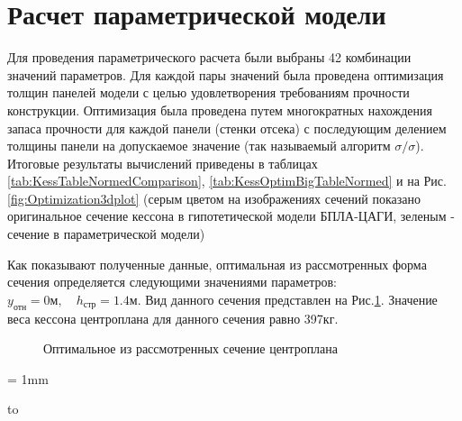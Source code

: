 \section{Расчет параметрической модели}
\label{sec:calculationOfModel}
Для проведения параметрического расчета были выбраны 42 комбинации значений параметров. Для каждой пары значений была проведена оптимизация толщин панелей модели с целью удовлетворения требованиям прочности конструкции. Оптимизация была проведена путем многократных нахождения запаса прочности для каждой панели (стенки отсека) с последующим делением толщины панели на допускаемое значение (так называемый алгоритм $\sigma/\sigma$). Итоговые результаты вычислений приведены в таблицах \ref{tab:KessTableNormedComparison}, \ref{tab:KessOptimBigTableNormed} и на Рис.\ref{fig:Optimization3dplot} (серым цветом на изображениях сечений показано оригинальное сечение кессона в гипотетической модели БПЛА-ЦАГИ, зеленым - сечение в параметрической модели)  


Как показывают полученные данные, оптимальная из рассмотренных форма сечения определяется следующими значениями параметров: $y_\text{отн} = 0\text{м},\quad h_\text{стр}=1.4\text{м}$. Вид данного сечения представлен на Рис.\ref{fig:optimalSection}. Значение веса кессона центроплана для данного сечения равно 397кг. 

\begin{figure}
\centering
\def\svgwidth{0.9\textwidth}

\caption{Оптимальное из рассмотренных сечение центроплана}
\label{fig:optimalSection}
\end{figure}



\tabulinesep = 1mm
\begin{table}[ht]
    \fontsize{11pt}{12pt}\selectfont
\captionsetup{justification=centering}
\caption{Зависимость веса кессона от параметров центроплана относительно варианта с прямым кессоном}
\begin{tabu}to 
\hline

\end{tabu}

\label{tab:KessTableNormedComparison}
\end{table}

